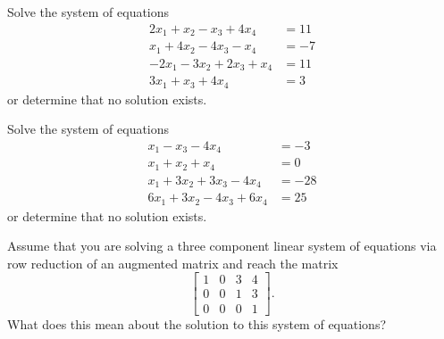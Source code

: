 \documentclass{ximera}
\begin{document}
\begin{exercise}%
    Solve the system of equations
    \begin{equation*}
        \begin{split}
            2x_1 + x_2 - x_3 + 4x_4 &= 11 \\
            x_1 + 4x_2  - 4x_3 - x_4 &= -7 \\
            -2x_1 - 3x_2 + 2x_3 + x_4 &= 11 \\
            3x_1 + x_3  + 4x_4 &= 3
        \end{split}
    \end{equation*}
    or determine that no solution exists. 
\end{exercise}

\begin{exercise}%
    Solve the system of equations
    \begin{equation*}
        \begin{split}
            x_1 - x_3 - 4x_4 &= -3 \\
            x_1 + x_2 + x_4 &= 0\\
            x_1 + 3x_2 + 3x_3 - 4x_4 &= -28 \\
            6x_1 + 3x_2 - 4x_3 + 6x_4 &= 25
        \end{split}
    \end{equation*}
    or determine that no solution exists. 
\end{exercise}

\begin{exercise}%
    Assume that you are solving a three component linear system of equations via row reduction of an augmented matrix and reach the matrix
    \begin{equation*}
        \left[ 
        \begin{array}{ccc|c}
            1 & 0 & 3 & 4 \\
            0 & 0 & 1 & 3 \\
            0 & 0 & 0 & 1
        \end{array}
        \right].
    \end{equation*}
    What does this mean about the solution to this system of equations?
\end{exercise}
\end{document}
